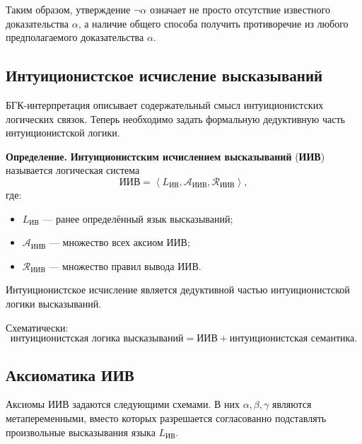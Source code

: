 \documentclass[12pt,a4paper,oneside,openany]{book}
\theoremstyle{definition}
\theoremstyle{plain}
\theoremstyle{remark}
\begin{document}
Таким образом, утверждение \(\neg\alpha\) означает не просто
отсутствие известного доказательства \(\alpha\), а наличие общего
способа получить противоречие из любого предполагаемого
доказательства \(\alpha\).

\subsection{Интуиционистское исчисление высказываний}

БГК-интерпретация описывает содержательный смысл интуиционистских
логических связок. Теперь необходимо задать формальную дедуктивную
часть интуиционистской логики.

\textbf{Определение.}
\textbf{Интуиционистским исчислением высказываний} (\textbf{ИИВ})
 называется логическая система
\[
\mathrm{ИИВ}
=
\left\langle
L_{\mathrm{ИВ}},
\mathcal A_{\mathrm{ИИВ}},
\mathcal R_{\mathrm{ИИВ}}
\right\rangle,
\]
где:

\begin{itemize}
    \item \(L_{\mathrm{ИВ}}\) --- ранее определённый язык
          высказываний;
    \item \(\mathcal A_{\mathrm{ИИВ}}\) --- множество всех аксиом ИИВ;
    \item \(\mathcal R_{\mathrm{ИИВ}}\) --- множество правил вывода ИИВ.
\end{itemize}

Интуиционистское исчисление является дедуктивной частью
интуиционистской логики высказываний.

Схематически:
\[
\boxed{
\text{интуиционистская логика высказываний}
=
\text{ИИВ}
+
\text{интуиционистская семантика}
}.
\]

\subsection{Аксиоматика ИИВ}

Аксиомы ИИВ задаются следующими схемами. В них
\(\alpha,\beta,\gamma\) являются метапеременными, вместо которых
разрешается согласованно подставлять произвольные высказывания языка
\(L_{\mathrm{ИВ}}\).
\end{document}
